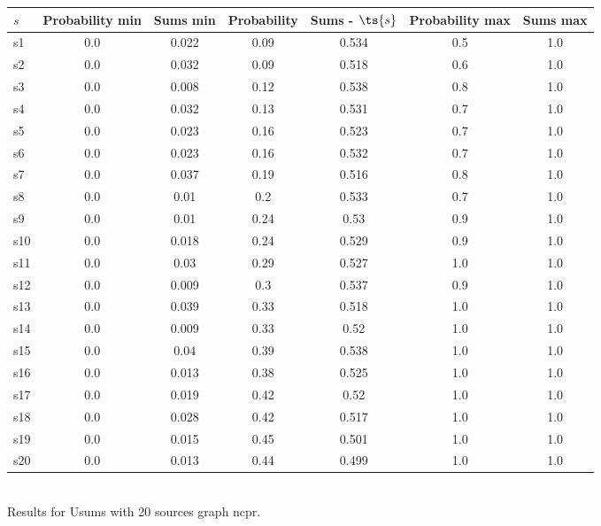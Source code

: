 \documentclass{article}
\begin{document}
\noindent\begin{tabular}{|l|c|c|c|c|c|c|}
\hline
$s$& Probability min & Sums min & Probability & Sums - $\ts{s}$ & Probability max & Sums max\\
\hline
s1 &0.0 & 0.022 & 0.09 & 0.534 & 0.5 & 1.0\\
\hline
s2 &0.0 & 0.032 & 0.09 & 0.518 & 0.6 & 1.0\\
\hline
s3 &0.0 & 0.008 & 0.12 & 0.538 & 0.8 & 1.0\\
\hline
s4 &0.0 & 0.032 & 0.13 & 0.531 & 0.7 & 1.0\\
\hline
s5 &0.0 & 0.023 & 0.16 & 0.523 & 0.7 & 1.0\\
\hline
s6 &0.0 & 0.023 & 0.16 & 0.532 & 0.7 & 1.0\\
\hline
s7 &0.0 & 0.037 & 0.19 & 0.516 & 0.8 & 1.0\\
\hline
s8 &0.0 & 0.01 & 0.2 & 0.533 & 0.7 & 1.0\\
\hline
s9 &0.0 & 0.01 & 0.24 & 0.53 & 0.9 & 1.0\\
\hline
s10 &0.0 & 0.018 & 0.24 & 0.529 & 0.9 & 1.0\\
\hline
s11 &0.0 & 0.03 & 0.29 & 0.527 & 1.0 & 1.0\\
\hline
s12 &0.0 & 0.009 & 0.3 & 0.537 & 0.9 & 1.0\\
\hline
s13 &0.0 & 0.039 & 0.33 & 0.518 & 1.0 & 1.0\\
\hline
s14 &0.0 & 0.009 & 0.33 & 0.52 & 1.0 & 1.0\\
\hline
s15 &0.0 & 0.04 & 0.39 & 0.538 & 1.0 & 1.0\\
\hline
s16 &0.0 & 0.013 & 0.38 & 0.525 & 1.0 & 1.0\\
\hline
s17 &0.0 & 0.019 & 0.42 & 0.52 & 1.0 & 1.0\\
\hline
s18 &0.0 & 0.028 & 0.42 & 0.517 & 1.0 & 1.0\\
\hline
s19 &0.0 & 0.015 & 0.45 & 0.501 & 1.0 & 1.0\\
\hline
s20 &0.0 & 0.013 & 0.44 & 0.499 & 1.0 & 1.0\\
\hline
\end{tabular}\\

\noindent Results for Usums with 20 sources graph ncpr.
\end{document}
